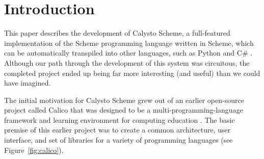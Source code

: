 \documentclass[acmsmall,screen,nonacm]{acmart}
\begin{document}



\maketitle


\section{Introduction}

This paper describes the development of Calysto Scheme, a full-featured
implementation of the Scheme programming language written in Scheme, which can
be automatically transpiled into other languages, such as Python and C\#
\cite{CalystoScheme}.  Although our path through the development of this system
was circuitous, the completed project ended up being far more interesting (and
useful) than we could have imagined.

The initial motivation for Calysto Scheme grew out of an earlier open-source
project called Calico that was designed to be a multi-programming-language
framework and learning environment for computing education \cite{Calico}.  The
basic premise of this earlier project was to create a common architecture, user
interface, and set of libraries for a variety of programming languages (see
Figure~\ref{fig:calico}).

\end{document}
